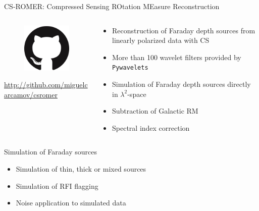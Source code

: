 \documentclass[xetex,aspectratio=169]{beamer}
\begin{document}
    \begin{frame}{CS-ROMER: Compressed Sensing ROtation MEasure Reconstruction}
        \begin{columns}[onlytextwidth,t]
        \begin{column}{.5\textwidth}
            \begin{figure}
                \centering
                \includegraphics[scale=0.5]{figures/logos/GitHub-Mark-120px-plus.png}
            \end{figure}
            
            \url{http://github.com/miguelcarcamov/csromer}
        \end{column}
    \begin{column}{.5\textwidth}
        \begin{itemize}
            \item Reconstruction of Faraday depth sources from linearly polarized data with CS
            \item More than 100 wavelet filters provided by {\tt Pywavelets}
            \item Simulation of Faraday depth sources directly in $\lambda^2$-space
            \item Subtraction of Galactic RM
            \item Spectral index correction
        \end{itemize}
    \end{column}%
    
    \end{columns}
    \end{frame}
    
    \begin{frame}{Simulation of Faraday sources}
    \begin{itemize}
        \item Simulation of thin, thick or mixed sources
        \item Simulation of RFI flagging
        \item Noise application to simulated data
    \end{itemize}
        
    \end{frame}
    
\end{document}
